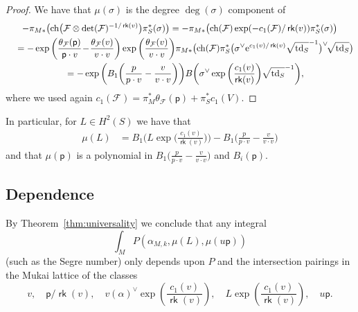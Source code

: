 \documentclass[pdftex]{sigma}
\numberwithin{equation}{section}
\newcommand{\CF}{{\mathcal F}}
\newcommand{\pt}{{\mathsf{p}}}
\newcommand{\ch}{{\mathrm{ch}}}
\newcommand{\td}{{\mathrm{td}}}
\newcommand{\1}{\mathsf{1}}
\newcommand\rk{\operatorname{\mathsf{rk}}}
\begin{document}
\begin{proof}
We have that $\mu(\sigma)$ is the degree $\deg(\sigma)$ component of
\begin{gather*}
- \pi_{M \ast} \big(\ch\big( \CF \otimes \det(\CF)^{-1/\rk(v)} \big) \pi_S^{\ast}(\sigma)\big)
=- \pi_{M \ast} \big(\ch( \CF) \exp( - c_1(\CF) / \rk(v) ) \pi_S^{\ast}(\sigma) \big)
\\ \quad
{}= - \exp\bigg( \frac{\theta_{\CF}(\pt)}{\pt \cdot v}\! -\! \frac{\theta_{\CF}(v)}{v \cdot v} \bigg)
\exp\bigg( \frac{\theta_{\CF}(v)}{v \cdot v} \bigg)
\pi_{M \ast}\big( \ch(\CF) \pi_S^{\ast}\big( \sigma^{\vee} {\rm e}^{c_1(v)/\rk(v)} \sqrt{\td_S}^{-1} \big)^{\vee}\! \sqrt{\td_S} \big)
\\ \quad
{}=  - \exp\bigg( B_1\bigg( \frac{p}{p \cdot v} - \frac{v}{v \cdot v} \bigg) \bigg)
B\bigg( \sigma^{\vee} \exp\bigg( \frac{c_1(v)}{\rk(v)} \bigg) \sqrt{\td_S}^{-1} \bigg),
\end{gather*}
where we used again $c_1(\CF) = \pi_{M}^{\ast} \theta_{\CF}(\pt) + \pi_S^{\ast} c_1(V)$.
\end{proof}

In particular, for $L \in H^2(S)$ we have that
\begin{align*}
\mu(L) & =
B_1\bigg(L \exp\bigg(\frac{c_1(v)}{\rk(v)}\bigg)\bigg) - B_1\bigg(\frac{p}{p \cdot v}
- \frac{v}{v\cdot v} \bigg)
\end{align*}
and that $\mu(\pt)$ is a polynomial in
$B_1\big(\frac{p}{p \cdot v} - \frac{v}{v \cdot v}\big)$ and $B_i(\pt)$.



\subsection{Dependence}
By Theorem~\ref{thm:universality} we conclude that any integral
\begin{equation}
\int_{M} P(\alpha_{M,k}, \mu(L), \mu(u \pt))
\label{integral}
\end{equation}
(such as the Segre number) only depends upon $P$ and
the intersection pairings in the Mukai lattice of the classes
\begin{equation} v, \quad
\pt/\rk(v), \quad
v(\alpha)^{\vee} \exp\left( \frac{c_1(v)}{\rk(v)} \right),
\quad L  \exp\left( \frac{c_1(v)}{\rk(v)} \right),
\quad u \pt. \label{dependence parameters} \end{equation}
\end{document}
